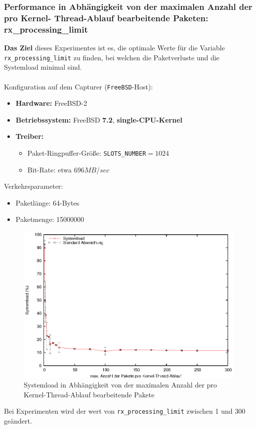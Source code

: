 \subsubsection*{Performance in Abhängigkeit von der maximalen Anzahl der pro Kernel-
Thread-Ablauf bearbeitende Paketen: rx\_processing\_limit}
\textbf{Das Ziel} dieses Experimentes ist es, die optimale Werte für die
Variable \verb+rx_processing_limit+ zu finden, bei welchen die Paketverluste
und die Systemload minimal sind.\\\\
%
Konfiguration auf dem Capturer (\verb+FreeBSD+-Host): 
\begin{itemize}
	\item \textbf{Hardware:} FreeBSD-2	
	\item \textbf{Betriebssystem:} FreeBSD \textbf{7.2}, \textbf{single-CPU-Kernel}
	\item \textbf{Treiber:} 
		\begin{itemize}
			\item Paket-Ringpuffer-Größe: \verb+SLOTS_NUMBER+$=1024$
			\item Bit-Rate: etwa $696MB/sec$
		\end{itemize}
\end{itemize}
Verkehrsparameter:
\begin{itemize}
	\item Paketlänge: 64-Bytes
	\item Paketmenge: 15000000
\end{itemize} 
\begin{figure} 
\centering \includegraphics[width=5.5in]{plots/graphs/sysload_single_kts}
\caption{Systemload in Abhängigkeit von der maximalen Anzahl der pro Kernel-Thread-Ablauf
bearbeitende Pakete}
\label{img:plot_sysload_kts}
\end{figure}
Bei Experimenten wird der wert von \verb+rx_processing_limit+ zwischen 1 und 300 
geändert.
